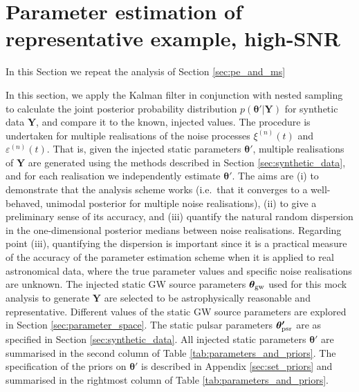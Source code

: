\documentclass[fleqn,usenatbib,useAMS]{mnras}
\begin{document}
\section{Parameter estimation of representative example, high-SNR} \label{sec:app_high_SNR}


In this Section we repeat the analysis of Section \ref{sec:pe_and_ms}



In this section, we apply the Kalman filter in conjunction with nested sampling to calculate the joint posterior probability distribution $p({\boldsymbol{\theta'}} | {\boldsymbol{Y}})$ for synthetic data $\boldsymbol{Y}$, and compare it to the known, injected values. The procedure is undertaken for multiple realisations of the noise processes $\xi^{(n)}(t)$ and $\varepsilon^{(n)}(t)$. That is, given the injected static parameters $\boldsymbol{\theta'}$, multiple realisations of $\boldsymbol{Y}$ are generated using the methods described in Section \ref{sec:synthetic_data}, and for each realisation we independently estimate $\boldsymbol{\theta'}$. The aims are (i) to demonstrate that the analysis scheme works (i.e.\ that it converges to a well-behaved, unimodal posterior for multiple noise realisations), (ii) to give a preliminary sense of its accuracy, and (iii) quantify the natural random dispersion in the one-dimensional posterior medians between noise realisations. 
Regarding point (iii), quantifying the dispersion is important since it is a practical measure of the accuracy of the parameter estimation scheme when it is applied to real astronomical data, where the true parameter values and specific noise realisations are unknown. The injected static GW source parameters $\boldsymbol{\theta}_{\rm gw}$ used for this mock analysis to generate $\boldsymbol{Y}$ are selected to be astrophysically reasonable and representative. Different values of the static GW source parameters are explored in Section \ref{sec:parameter_space}. The static pulsar parameters $\boldsymbol{\theta'}_{\rm psr}$  are as specified in Section \ref{sec:synthetic_data}. All injected static parameters $\boldsymbol{\theta}'$ are summarised in the second column of Table \ref{tab:parameters_and_priors}. The specification of the priors on $\boldsymbol{\theta'}$ is described in Appendix \ref{sec:set_priors} and summarised in the rightmost column of Table \ref{tab:parameters_and_priors}. \newline
\end{document}

